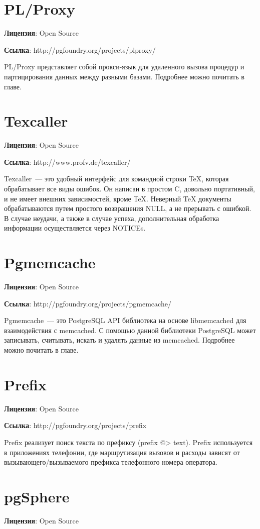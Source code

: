 \section{PL/Proxy}
\textbf{Лицензия}: Open Source

\textbf{Ссылка}: http://pgfoundry.org/projects/plproxy/

PL/Proxy представляет собой прокси-язык для удаленного вызова процедур и партицирования данных между разными базами. 
Подробнее можно почитать в  главе.

\section{Texcaller}
\textbf{Лицензия}: Open Source

\textbf{Ссылка}: http://www.profv.de/texcaller/

Texcaller~--- это удобный интерфейс для командной строки TeX, которая обрабатывает все виды ошибок. Он написан в простом C, довольно портативный, 
и не имеет внешних зависимостей, кроме TeX. Неверный TeX документы обрабатываются путем простого возвращения NULL, 
а не прерывать с ошибкой. В случае неудачи, а также в случае успеха, дополнительная обработка информации осуществляется через NOTICEs.

\section{Pgmemcache}
\textbf{Лицензия}: Open Source

\textbf{Ссылка}: http://pgfoundry.org/projects/pgmemcache/

Pgmemcache~--- это PostgreSQL API библиотека на основе libmemcached для взаимодействия с memcached. С помощью данной библиотеки 
PostgreSQL может записывать, считывать, искать и удалять данные из memcached. Подробнее можно почитать в  главе.

\section{Prefix}
\textbf{Лицензия}: Open Source

\textbf{Ссылка}: http://pgfoundry.org/projects/prefix

Prefix реализует поиск текста по префиксу (prefix @> text). 
Prefix используется в приложениях телефонии, где маршрутизация вызовов и расходы зависят от 
вызывающего/вызываемого префикса телефонного номера оператора.

\section{pgSphere}
\textbf{Лицензия}: Open Source

